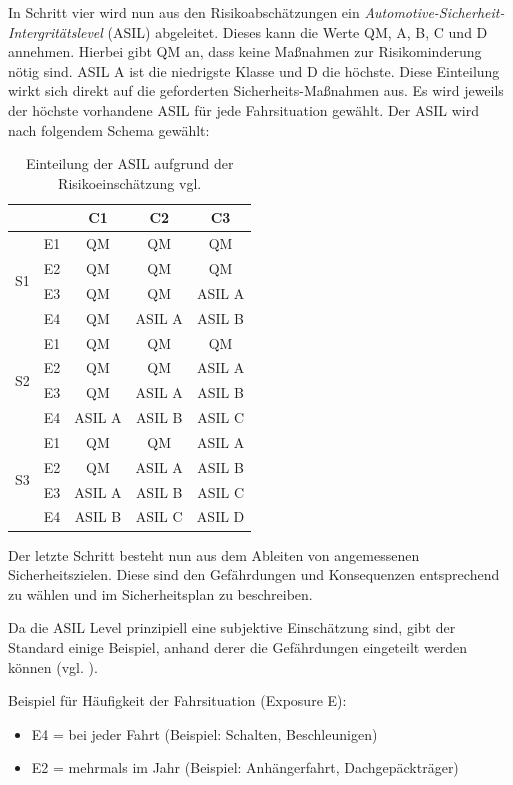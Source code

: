 \documentclass[a4paper,DIV=calc,ngerman]{scrartcl}
\begin{document}
In Schritt vier wird nun aus den Risikoabschätzungen ein \emph{Automotive-Sicherheit-Intergritätslevel} (ASIL) abgeleitet. Dieses kann die Werte QM, A, B, C und D annehmen. Hierbei gibt QM an, dass keine Maßnahmen zur Risikominderung nötig sind. ASIL A ist die niedrigste Klasse und D die höchste. Diese Einteilung wirkt sich direkt auf die geforderten Sicherheits-Maßnahmen aus. Es wird jeweils der höchste vorhandene ASIL für jede Fahrsituation gewählt. Der ASIL wird nach folgendem Schema gewählt:


\begin{table}[h]
\center
\begin{tabular}[h]{c c | c c c}
\toprule
 &  & C1 & C2 & C3\\
\midrule
\multirow{4}{*}{S1} & E1 & QM & QM & QM\\
 & E2 & QM & QM & QM\\
 & E3 & QM & QM & ASIL A\\
 & E4 & QM & ASIL A & ASIL B\\
\midrule
\multirow{4}{*}{S2} & E1 & QM & QM & QM\\
 & E2 & QM & QM & ASIL A\\
 & E3 & QM & ASIL A & ASIL B\\
 & E4 & ASIL A & ASIL B & ASIL C\\
\midrule
\multirow{4}{*}{S3} & E1 & QM & QM & ASIL A\\
 & E2 & QM & ASIL A & ASIL B\\
 & E3 & ASIL A & ASIL B & ASIL C\\
 & E4 & ASIL B & ASIL C & ASIL D\\
\bottomrule
\end{tabular}
\caption{Einteilung der ASIL aufgrund der Risikoeinschätzung vgl. \cite[S. 125]{1}}
\label{tab:asil}
\end{table}

Der letzte Schritt besteht nun aus dem Ableiten von angemessenen Sicherheitszielen. Diese sind den Gefährdungen und Konsequenzen entsprechend zu wählen und im Sicherheitsplan zu beschreiben.

Da die ASIL Level prinzipiell eine subjektive Einschätzung sind, gibt der Standard einige Beispiel, anhand derer die Gefährdungen eingeteilt werden können  (vgl. \cite[S. 125]{1}).

Beispiel für Häufigkeit der Fahrsituation (Exposure E):
\begin{itemize}
    \item E4 = bei jeder Fahrt (Beispiel: Schalten, Beschleunigen)
    \item E2 = mehrmals im Jahr (Beispiel: Anhängerfahrt, Dachgepäckträger)
\end{itemize}
\end{document}
